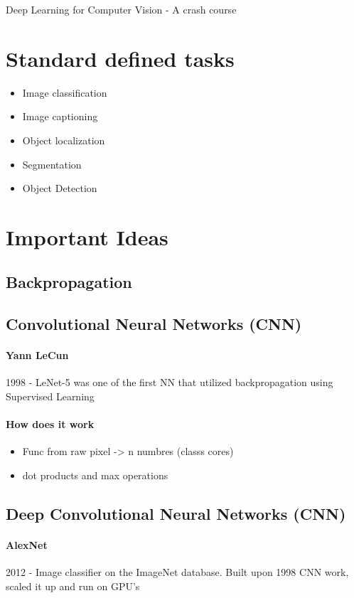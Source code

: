 \documentclass{article}
\begin{document}
	Deep Learning for Computer Vision - A crash course
	
	\section{Standard defined tasks}
	\begin{itemize}
		\item Image classification
		\item Image captioning
		\item Object localization
		\item Segmentation
		\item Object Detection
		
	\end{itemize}
	\section{Important Ideas}
	\subsection{Backpropagation}
	
	\subsection{Convolutional Neural Networks (CNN)}
		\paragraph{Yann LeCun}
			1998 - LeNet-5 was one of the first NN that utilized backpropagation using Supervised Learning
			
		\paragraph{How does it work}
		\begin{itemize}
			\item Func from raw pixel -> n numbres (classs cores) 
			\item dot products and max operations 
		\end{itemize}
			
	\subsection{Deep Convolutional Neural Networks (CNN)}
		\paragraph{AlexNet}
		2012 - Image classifier on the ImageNet database. Built upon 1998 CNN work, scaled it up and run on GPU's
\end{document}
